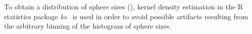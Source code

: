 
To obtain a distribution of sphere sizes (), kernel density estimation in the R
statistics package \emph{ks}~\cite{Duong_2007} is used in order to avoid possible artifacts
resulting from the arbitrary binning of the histogram of sphere sizes. 

